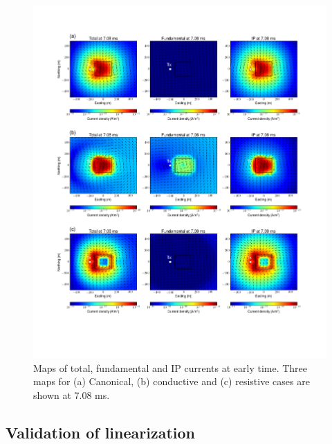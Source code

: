 \documentclass[a4paper, 11pt]{article}
\begin{document}
\begin{figure}[htb]
  \centering  \includegraphics[width=1.0\textwidth]{figures/threecasesresp/IPcurrents_ch38.png}
  \caption{Maps of total, fundamental and IP currents at early time. Three maps for  (a) Canonical, (b) conductive and (c) resistive cases are shown at 7.08 ms.}
  \label{F:IPcurrents2}
\end{figure}

\subsection{Validation of linearization}

\end{document}

